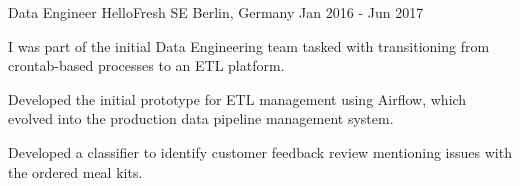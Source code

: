 \begin{cventries}

  \cventry
    {Data Engineer} %
    {HelloFresh SE} %
    {Berlin, Germany} %
    {Jan 2016 - Jun 2017} %
    {
      \begin{cvitems} %
        \item {I was part of the initial Data Engineering team tasked with transitioning from crontab-based processes to an ETL platform.}
        \item {Developed the initial prototype for ETL management using Airflow, which evolved into the production data pipeline management system.}
        \item {Developed a classifier to identify customer feedback review mentioning issues with the ordered meal kits.}
      \end{cvitems}
    }
	

\end{cventries}
